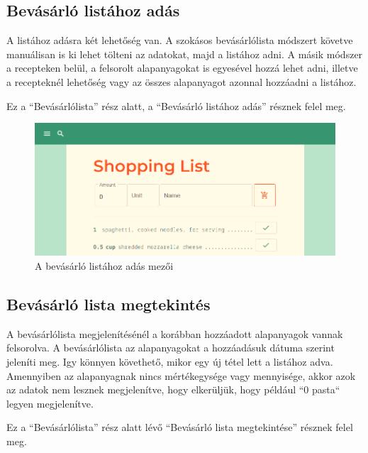 \documentclass[12pt]{report}
\theoremstyle{definition}
\begin{document}
\subsection{Bevásárló listához adás}
A listához adásra két lehetőség van. A szokásos bevásárlólista módszert követve manuálisan is ki lehet tölteni az adatokat, majd a listához adni. A másik módszer a recepteken belül, a felsorolt alapanyagokat is egyesével hozzá lehet adni, illetve a recepteknél lehetőség vagy az összes alapanyagot azonnal hozzáadni a listához. 

Ez  a “Bevásárlólista” rész alatt, a “Bevásárló listához adás” résznek felel meg.

\begin{figure}[H]%
    \centering
    \includegraphics[width=11.5cm]{pictures/web_shoppinglist-add.png}
	\caption{A bevásárló listához adás mezői}%
    \label{fig:shoppinglistAdd}%
\end{figure}


\subsection{Bevásárló lista megtekintés}
A bevásárlólista megjelenítésénél a korábban hozzáadott alapanyagok vannak felsorolva. A bevásárlólista az alapanyagokat a hozzáadásuk dátuma szerint jeleníti meg. Igy könnyen követhető, mikor egy új tétel lett a listához adva.  Amennyiben az alapanyagnak nincs mértékegysége vagy mennyisége, akkor azok az adatok nem lesznek megjelenítve, hogy elkerüljük, hogy például “0 pasta“ legyen megjelenítve.

Ez  a “Bevásárlólista” rész alatt lévő “Bevásárló lista megtekintése” résznek felel meg.
\end{document}
